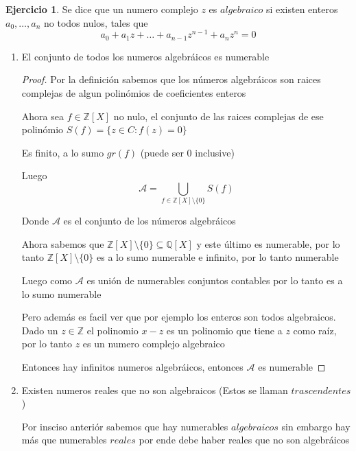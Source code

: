\documentclass[12pt]{article}
\newcommand{\Q}{\mathbb{Q}}
\newcommand{\Z}{\mathbb{Z}}
\theoremstyle{definition}
\newtheorem{ej}{Ejercicio}
\begin{document}
\begin{ej}
Se dice que un numero complejo $z$ es $algebraico$ si existen enteros $a_{0}, \dots , a_{n}$ no todos nulos, tales que $$ a_{0} + a_{1}z + \dots + a_{n-1}z^{n-1} + a_{n}z^{n} = 0$$

\begin{enumerate}
  \item El conjunto de todos los numeros algebráicos es numerable

    \begin{proof}
       Por la definición sabemos que los números algebráicos son raices complejas de algun polinómios de coeficientes enteros 
       
     Ahora sea $f \in \Z[X]$ no nulo, el conjunto de las raices complejas de ese polinómio $S(f) = \{z \in C : f(z) = 0\}$

     Es finito, a lo sumo $gr(f)$ (puede ser 0 inclusive)

     Luego $$ \mathcal{A} = \bigcup_{f \in \Z[X] \setminus \{0\}} S(f)$$

     Donde $\mathcal{A}$ es el conjunto de los números algebráicos

     Ahora sabemos que $\Z[X] \setminus \{0\} \subseteq \Q[X]$ y este último es numerable, por lo tanto $\Z[X] \setminus \{0\}$ es a lo sumo numerable e infinito, por lo tanto numerable

     Luego como $\mathcal{A}$ es unión de numerables conjuntos contables por lo tanto es a lo sumo numerable

     Pero además es facil ver que por ejemplo los enteros son todos algebraicos. Dado un $z \in \Z$ el polinomio $x - z$ es un polinomio que tiene a $z$ como raíz, por lo tanto $z$ es un numero complejo algebraico 

     Entonces hay infinitos numeros algebráicos, entonces $\mathcal{A}$ es numerable

    \end{proof}

 
  \item Existen numeros reales que no son algebraicos (Estos se llaman $trascendentes$) 

 Por insciso anteriór sabemos que hay numerables $algebraicos$ sin embargo hay más que numerables $reales$ por ende debe haber reales que no son algebráicos
\end{enumerate}
\end{ej}
\end{document}

